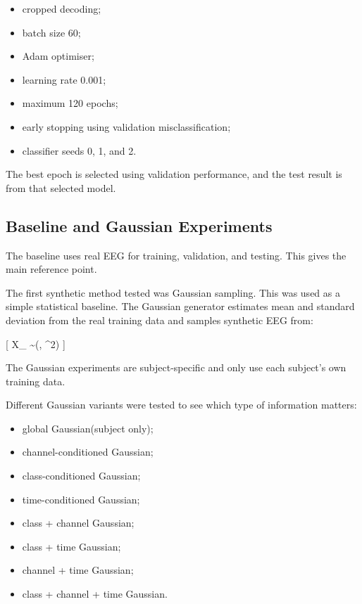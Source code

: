 \documentclass[conference]{IEEEtran}
\begin{document}
\begin{itemize}
\item cropped decoding;
\item batch size 60;
\item Adam optimiser;
\item learning rate 0.001;
\item maximum 120 epochs;
\item early stopping using validation misclassification;
\item classifier seeds 0, 1, and 2.
\end{itemize}

The best epoch is selected using validation performance, and the test result is from that selected model.

\vspace{0.5em}

\subsection{Baseline and Gaussian Experiments}

The baseline uses real EEG for training, validation, and testing. This gives the main reference point.

The first synthetic method tested was Gaussian sampling. This was used as a simple statistical baseline. The Gaussian generator estimates mean and standard deviation from the real training data and samples synthetic EEG from:

[
X_{} \sim {}(\mu, \sigma^2)
]

The Gaussian experiments are subject-specific and only use each subject's own training data.

Different Gaussian variants were tested to see which type of information matters:

\begin{itemize}
\item global Gaussian(subject only);
\item channel-conditioned Gaussian;
\item class-conditioned Gaussian;
\item time-conditioned Gaussian;
\item class + channel Gaussian;
\item class + time Gaussian;
\item channel + time Gaussian;
\item class + channel + time Gaussian.
\end{itemize}
\end{document}
